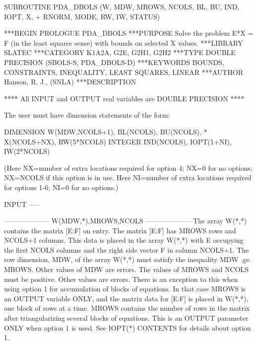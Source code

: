 \documentclass[11pt,twoside,nolof]{starlink}
\begin{document}



\begin{terminalv}
      SUBROUTINE PDA_DBOLS (W, MDW, MROWS, NCOLS, BL, BU, IND, IOPT, X,
     +   RNORM, MODE, RW, IW, STATUS)


***BEGIN PROLOGUE  PDA_DBOLS
***PURPOSE  Solve the problem
                 E*X = F (in the least  squares  sense)
            with bounds on selected X values.
***LIBRARY   SLATEC
***CATEGORY  K1A2A, G2E, G2H1, G2H2
***TYPE      DOUBLE PRECISION (SBOLS-S, PDA_DBOLS-D)
***KEYWORDS  BOUNDS, CONSTRAINTS, INEQUALITY, LEAST SQUARES, LINEAR
***AUTHOR  Hanson, R. J., (SNLA)
***DESCRIPTION

   **** All INPUT and OUTPUT real variables are DOUBLE PRECISION ****

     The user must have dimension statements of the form:

       DIMENSION W(MDW,NCOLS+1), BL(NCOLS), BU(NCOLS),
      * X(NCOLS+NX), RW(5*NCOLS)
       INTEGER IND(NCOLS), IOPT(1+NI), IW(2*NCOLS)

     (Here NX=number of extra locations required for option 4; NX=0
     for no options; NX=NCOLS if this option is in use. Here NI=number
     of extra locations required for options 1-6; NI=0 for no
     options.)

   INPUT
   -----

    --------------------
    W(MDW,*),MROWS,NCOLS
    --------------------
     The array W(*,*) contains the matrix [E:F] on entry. The matrix
     [E:F] has MROWS rows and NCOLS+1 columns. This data is placed in
     the array W(*,*) with E occupying the first NCOLS columns and the
     right side vector F in column NCOLS+1. The row dimension, MDW, of
     the array W(*,*) must satisfy the inequality MDW .ge. MROWS.
     Other values of MDW are errors. The values of MROWS and NCOLS
     must be positive. Other values are errors. There is an exception
     to this when using option 1 for accumulation of blocks of
     equations. In that case MROWS is an OUTPUT variable ONLY, and the
     matrix data for [E:F] is placed in W(*,*), one block of rows at a
     time.  MROWS contains the number of rows in the matrix after
     triangularizing several blocks of equations. This is an OUTPUT
     parameter ONLY when option 1 is used. See IOPT(*) CONTENTS
     for details about option 1.


\end{terminalv}
\end{document}
